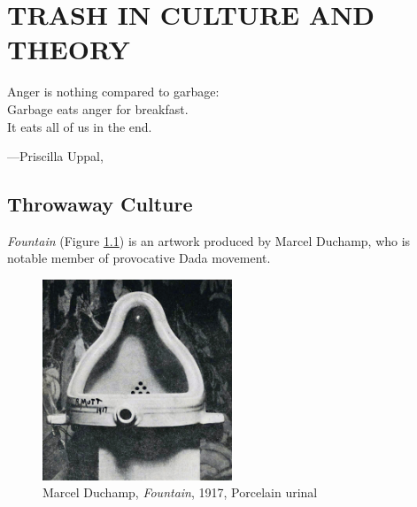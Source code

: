 \chapter{TRASH IN CULTURE AND THEORY}



\begin{singlespace}
\epigraph{Anger is nothing compared to garbage:\\Garbage eats anger for breakfast.\\It eats all of us in the end.}{\hfill---Priscilla Uppal, }
\end{singlespace}



\lipsum[1-1]



\section{Throwaway Culture}

\lipsum[1-1]

\textit{Fountain} (Figure \ref{fig:Duchamp_Fountaine}) is an artwork produced by Marcel Duchamp, who is notable member of provocative Dada movement. 

\begin{figure}[h!]
  \centering
  \includegraphics[height=6cm]{graphics/Duchamp_Fountaine.jpg}
  \caption{Marcel Duchamp, \textit{Fountain}, 1917, Porcelain urinal}
  \label{fig:Duchamp_Fountaine}
\end{figure}

